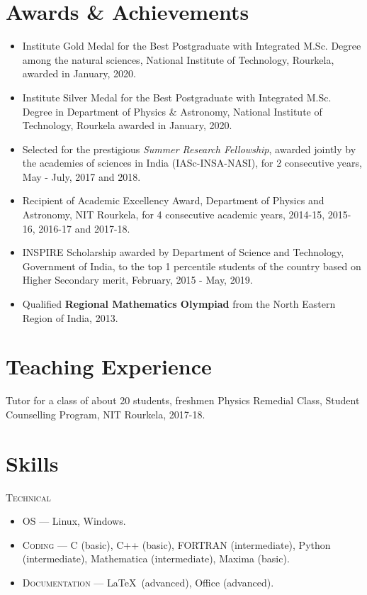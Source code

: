 \documentclass[11pt, letterpaper]{article}
\newcommand{\entry}[4]{
	\ifthenelse{\isempty{#3}}
	{\slimentry{#1}{#2}}{
	\begin{minipage}[t]{.25\linewidth}
		\hfill \textsc{#1}
	\end{minipage}
	\hfill\vline\hfill
	\begin{minipage}[t]{.7\linewidth}
		{\bf#2} \\ \textsf{#3} \\ \footnotesize{#4}
	\end{minipage}\\
	\vspace{.2cm}
}}
\newcommand{\slimentry}[2]{
	\begin{minipage}[t]{.25\linewidth}
	\hfill \textsc{#1}
	\end{minipage}
	\hfill\vline\hfill
	\begin{minipage}[t]{.7\linewidth}
	#2
	\end{minipage}\\
	\vspace{.25cm}
}%
\begin{document}
	\section{Awards \& Achievements}
	\begin{itemize}
		\renewcommand{\labelitemi}{\color{blue}$\scriptstyle{\lozenge}$}
		
		\item Institute Gold Medal for the Best Postgraduate with Integrated M.Sc. Degree among the natural sciences, National Institute of Technology, Rourkela, awarded in January, 2020.
		
		\item Institute Silver Medal for the Best Postgraduate with Integrated M.Sc. Degree in Department of Physics \& Astronomy, National Institute of Technology, Rourkela awarded in January, 2020.
		
		\item Selected for the prestigious \emph{Summer Research Fellowship}, awarded jointly by the academies of sciences in India (IASc-INSA-NASI), for 2 consecutive years, May - July, 2017 and 2018.
		
		\item Recipient of Academic Excellency Award, Department of Physics and Astronomy, NIT Rourkela, for 4 consecutive academic years, 2014-15, 2015-16, 2016-17 and 2017-18.
		
		\item INSPIRE Scholarship awarded by Department of Science and Technology, Government of India, to the top 1 percentile students of the country based on Higher Secondary merit, February, 2015 - May, 2019.
		
		\item Qualified \textbf{Regional Mathematics Olympiad} from the North Eastern Region of India, 2013.
	\end{itemize}
	
	\section{Teaching Experience}
	Tutor for a class of about 20 students, freshmen Physics Remedial Class, Student Counselling Program, NIT Rourkela, 2017-18. 
	
	\section{Skills}
	\slimentry{Technical}{\begin{itemize}
			\item \textsc{OS} --- Linux, Windows.
			\item \textsc{Coding} --- C (basic), C++ (basic), FORTRAN (intermediate), Python (intermediate), Mathematica (intermediate), Maxima (basic).
			\item \textsc{Documentation} --- \LaTeX\ (advanced), Office (advanced).
		\end{itemize}}
\end{document}
